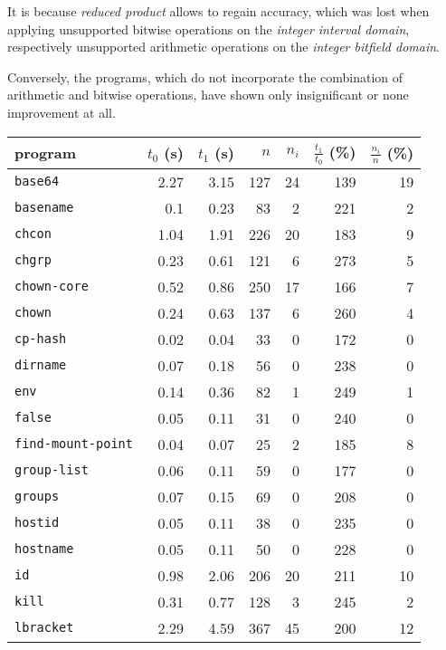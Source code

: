 \documentclass[12pt,oneside]{fithesis2}
\theoremstyle{definition}
\begin{document}
It is because \textit{reduced product} allows to regain accuracy, which was lost when applying unsupported bitwise operations on the \textit{integer interval domain}, respectively unsupported arithmetic operations on the \textit{integer bitfield domain}.

Conversely, the programs, which do not incorporate the combination of arithmetic and bitwise operations, have shown only insignificant or none improvement at all.

\begin{table}[ht!]
  \scriptsize
  \centering
  \begin{tabular}{l rrrr | rr}
    program & $t_0$ (s) & $t_1$ (s) & $n$ & $n_i$ & $\frac{t_1}{t_0}$ (\%) & $\frac{n_i}{n}$ (\%) \\
    \midrule

    \texttt{base64} & 2.27 & 3.15 & 127 & 24 & 139 & 19 \\
    \texttt{basename} & 0.1 & 0.23 & 83 & 2 & 221 & 2 \\
    \texttt{chcon} & 1.04 & 1.91 & 226 & 20 & 183 & 9 \\
    \texttt{chgrp} & 0.23 & 0.61 & 121 & 6 & 273 & 5 \\
    \texttt{chown-core} & 0.52 & 0.86 & 250 & 17 & 166 & 7 \\
    \texttt{chown} & 0.24 & 0.63 & 137 & 6 & 260 & 4 \\
    \texttt{cp-hash} & 0.02 & 0.04 & 33 & 0 & 172 & 0 \\
    \texttt{dirname} & 0.07 & 0.18 & 56 & 0 & 238 & 0 \\
    \texttt{env} & 0.14 & 0.36 & 82 & 1 & 249 & 1 \\
    \texttt{false} & 0.05 & 0.11 & 31 & 0 & 240 & 0 \\
    \texttt{find-mount-point} & 0.04 & 0.07 & 25 & 2 & 185 & 8 \\
    \texttt{group-list} & 0.06 & 0.11 & 59 & 0 & 177 & 0 \\
    \texttt{groups} & 0.07 & 0.15 & 69 & 0 & 208 & 0 \\
    \texttt{hostid} & 0.05 & 0.11 & 38 & 0 & 235 & 0 \\
    \texttt{hostname} & 0.05 & 0.11 & 50 & 0 & 228 & 0 \\
    \texttt{id} & 0.98 & 2.06 & 206 & 20 & 211 & 10 \\
    \texttt{kill} & 0.31 & 0.77 & 128 & 3 & 245 & 2 \\
    \texttt{lbracket} & 2.29 & 4.59 & 367 & 45 & 200 & 12 \\

\end{tabular}
\end{table}
\end{document}
